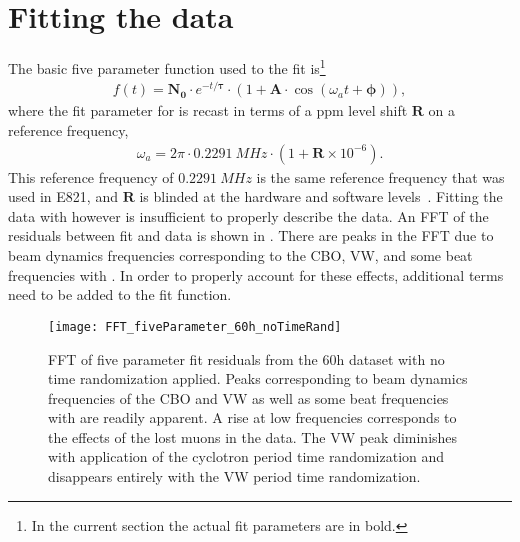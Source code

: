 \section{Fitting the data}
\label{sec:Fitting}


The basic five parameter function used to the fit is\footnote{In the current section the actual fit parameters are in bold.}
    \begin{align}
        f(t) = \boldsymbol{N_{0}} \cdot e^{-t/\boldsymbol{\tau}} \cdot (1 + \boldsymbol{A} \cdot \cos(\omega_{a}t + \boldsymbol{\phi})),
    \label{eq:fiveparfuncagain}
    \end{align}
where the fit parameter for \wa is recast in terms of a ppm level shift $\boldsymbol{R}$ on a reference frequency,
    \begin{align}
        \omega_{a} = 2 \pi \cdot \SI{0.2291}{MHz} \cdot (1 + \boldsymbol{R} \times 10^{-6}).
    \label{eq:wablind}
    \end{align}
This reference frequency of $\SI{0.2291}{MHz}$ is the same reference frequency that was used in E821, and $\boldsymbol{R}$ is blinded at the hardware and software levels~\cite{ClockManual,SoftwareBlinding}. Fitting the data with  however is insufficient to properly describe the data. An FFT of the residuals between fit and data is shown in . There are peaks in the FFT due to beam dynamics frequencies corresponding to the CBO, VW, and some beat frequencies with \wa. In order to properly account for these effects, additional terms need to be added to the fit function. 


\begin{figure}[ht]
    \centering
    \texttt{[image: FFT\_fiveParameter\_60h\_noTimeRand]}
    \caption[FFT of five parameter fit residuals]{FFT of five parameter fit residuals from the 60h dataset with no time randomization applied. Peaks corresponding to beam dynamics frequencies of the CBO and VW as well as some beat frequencies with \wa are readily apparent. A rise at low frequencies corresponds to the effects of the lost muons in the data. The VW peak diminishes with application of the cyclotron period time randomization and disappears entirely with the VW period time randomization.}
    \label{fig:FFT_fiveParameter}
\end{figure}


